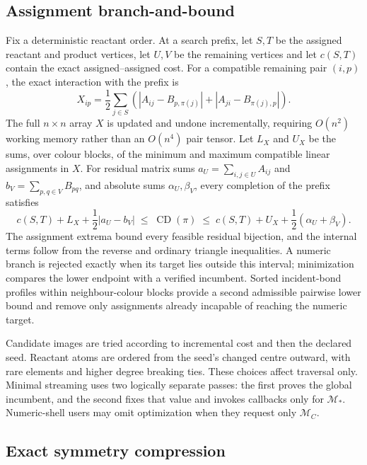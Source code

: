 \documentclass[11pt]{article}
\newcommand{\CD}{\operatorname{CD}}
\begin{document}
\subsection*{Assignment branch-and-bound}

Fix a deterministic reactant order.  At a search prefix, let $S,T$ be the
assigned reactant and product vertices, let $U,V$ be the remaining vertices
and let $c(S,T)$ contain the exact assigned--assigned cost.  For a compatible
remaining pair $(i,p)$, the exact interaction with the prefix is
\begin{equation}
 X_{ip}=\frac12\sum_{j\in S}
 \left(|A_{ij}-B_{p,\pi(j)}|+|A_{ji}-B_{\pi(j),p}|\right).
 \label{eq:cross-cost}
\end{equation}
The full $n\times n$ array $X$ is updated and undone incrementally, requiring
$O(n^2)$ working memory rather than an $O(n^4)$ pair tensor.  Let $L_X$ and
$U_X$ be the sums, over colour blocks, of the minimum and maximum compatible
linear assignments in $X$.  For residual matrix sums
$a_U=\sum_{i,j\in U}A_{ij}$ and $b_V=\sum_{p,q\in V}B_{pq}$, and absolute sums
$\alpha_U,\beta_V$, every completion of the prefix satisfies
\begin{equation}
 c(S,T)+L_X+\frac12|a_U-b_V|
 \;\leq\;\CD(\pi)\;\leq\;
 c(S,T)+U_X+\frac12(\alpha_U+\beta_V).
 \label{eq:subtree-interval}
\end{equation}
The assignment extrema bound every feasible residual bijection, and the
internal terms follow from the reverse and ordinary triangle inequalities.
A numeric branch is rejected exactly when its target lies outside this
interval; minimization compares the lower endpoint with a verified incumbent.
Sorted incident-bond profiles within neighbour-colour blocks provide a
second admissible pairwise lower bound and remove only assignments already
incapable of reaching the numeric target.

Candidate images are tried according to incremental cost and then the declared
seed.  Reactant atoms are ordered from the seed's changed centre outward, with
rare elements and higher degree breaking ties.  These choices affect traversal
only.  Minimal streaming uses two logically separate passes: the first proves
the global incumbent, and the second fixes that value and invokes callbacks
only for $\mathcal M_*$.  Numeric-shell users may omit optimization when they
request only $\mathcal M_C$.

\subsection*{Exact symmetry compression}
\end{document}
